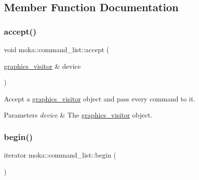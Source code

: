 \subsection{Member Function Documentation}
\mbox{\label{classmoka_1_1command__list_a4f0eec40ea95594a8558b4335a7de4a9}} 
\subsubsection{\texorpdfstring{accept()}{accept()}}
{\footnotesize\ttfamily void moka\+::command\+\_\+list\+::accept (\begin{DoxyParamCaption}\item[{\mbox{\hyperlink{classmoka_1_1graphics__visitor}{graphics\+\_\+visitor}} \&}]{device }\end{DoxyParamCaption})}



Accept a \mbox{\hyperlink{classmoka_1_1graphics__visitor}{graphics\+\_\+visitor}} object and pass every command to it. 


\begin{DoxyParams}{Parameters}
{\em device} & The \mbox{\hyperlink{classmoka_1_1graphics__visitor}{graphics\+\_\+visitor}} object. \\
\hline
\end{DoxyParams}
\mbox{\label{classmoka_1_1command__list_ae98e0e3732a2b8a0cd0cd26f72f8a5a7}} 
\subsubsection{\texorpdfstring{begin()}{begin()}\hspace{0.1cm}{\footnotesize\ttfamily [1/2]}}
{\footnotesize\ttfamily iterator moka\+::command\+\_\+list\+::begin (\begin{DoxyParamCaption}{ }\end{DoxyParamCaption})}

\mbox{\label{classmoka_1_1command__list_a8d39d8468c75189155278881bd24c756}} 
